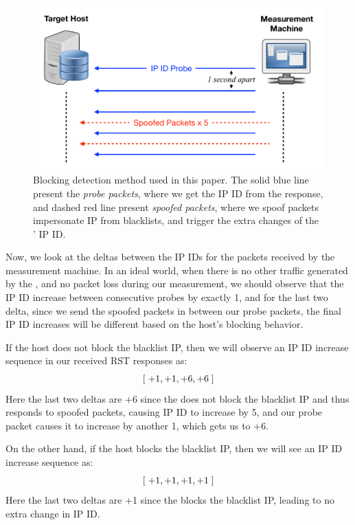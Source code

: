 \begin{figure}[t]
\centering
\includegraphics[width=0.85\columnwidth]{images/croped_design_implementation.pdf}
\caption{Blocking detection method used in this paper. The solid blue line present
the \textit{probe packets}, where we get the IP ID from the response, and dashed red line
present \textit{spoofed packets}, where we spoof packets impersonate IP from
blacklists, and trigger the extra changes of the {}' IP ID.}
\label{fig:design_implementation}
\end{figure}

Now, we look at the deltas between the IP IDs for the packets received by the
measurement machine. In an ideal world, when there is no other traffic
generated by the {}, and no packet loss during our measurement, we
should observe that the IP ID increase between consecutive probes by exactly
1, and for the last two delta, since we send the spoofed packets in between
our probe packets, the final IP ID increases will be different based on the
host's blocking behavior.

If the host does not block the blacklist IP, then
we will observe an IP ID increase sequence in our received RST responses as:
\[[\hspace{0.1cm} +1, +1, +6, +6 \hspace{0.1cm}]\]
Here the last two deltas are +6 since the {} does not block the
blacklist IP and thus responds to spoofed packets, causing IP ID to increase by
5, and our probe packet causes it to increase by another 1, which gets us to +6.

On the other hand, if the host blocks the blacklist IP, then we will see an IP
ID increase sequence as:
\[ [\hspace{0.1cm} +1, +1, +1, +1 \hspace{0.1cm}] \]
Here the last two deltas are +1 since the {} blocks the blacklist IP,
leading to no extra change in IP ID.

